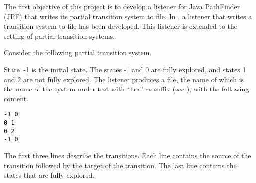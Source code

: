 \documentclass[12pt]{article}
\theoremstyle{definition}
\begin{document}
The first objective of this project is to develop a listener for Java PathFinder (JPF) that writes its partial transition system to file.  In \cite[Section~7.3]{B20}, a listener that writes a transition system to file has been developed.  This listener is extended to the setting of partial transition systems.

Consider the following partial transition system.
\begin{center}
\end{center}
State~-1 is the initial state.  The states -1 and 0 are fully explored, and  states 1 and 2 are not fully explored.  The listener produces a file, the name of which is the name of the system under test with ``.tra'' as suffix (see \cite[Section 7.4]{B20}), with the following content.
\begin{verbatim}
-1 0
0 1
0 2
-1 0
\end{verbatim}
The first three lines describe the transitions.  Each line contains the source of the transition followed by the target of the transition.  The last line contains the states that are fully explored.



\end{document}
